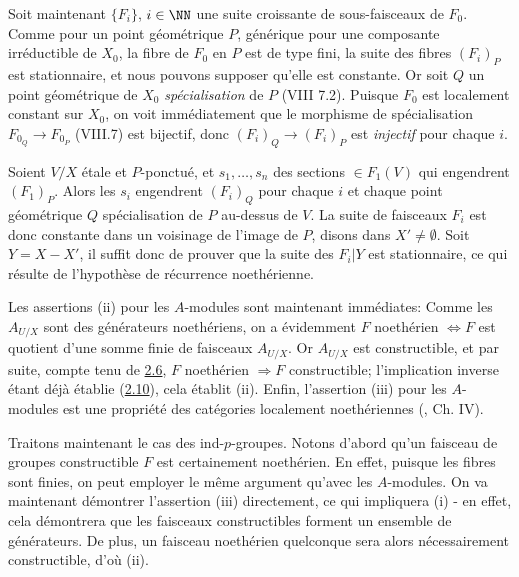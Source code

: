 \documentclass[10pt]{../fichiers-configuration-latex/smfart}
\begin{document}
Soit maintenant $\{F_i\}$, $i\in \NN$ une suite
croissante de sous-faisceaux de $F_0$. Comme pour un point géométrique
$P$, générique pour une composante irréductible de $X_0$, la fibre de
$F_0$ en $P$ est de type fini, la suite des fibres
$(F_i)_P$\pageoriginale est stationnaire, et nous pouvons supposer
qu'elle est constante. Or soit $Q$ un point géométrique de $X_0$
\emph{spécialisation} de $P$ (VIII 7.2). Puisque $F_0$ est localement
constant sur $X_0$, on voit immédiatement que le morphisme de
spécialisation $F_{0_Q}\rightarrow F_{0_P}$ (VIII.7) est bijectif,
donc $(F_i)_Q\rightarrow (F_i)_P$ est \emph{injectif} pour chaque $i$.

Soient $V/X$ étale et $P$-ponctué, et $s_1,\ldots,s_n$ des sections
$\in F_1(V)$ qui engendrent $(F_1)_P$. Alors les $s_i$ engendrent
$(F_i)_Q$ pour chaque $i$ et chaque point géométrique $Q$
spécialisation de $P$ au-dessus de $V$. La suite de faisceaux $F_i$
est donc constante dans un voisinage de l'image de $P$, disons dans
$X'\neq ∅$. Soit $Y=X-X'$, il suffit donc de prouver que la suite
des $F_i| Y$ est stationnaire, ce qui résulte de l'hypothèse de
récurrence noethérienne.

Les assertions (ii) pour les $A$-modules sont maintenant immédiates:
Comme les $A_{U/X}$ sont des générateurs noethériens, on a évidemment
$F$ noethérien $\Leftrightarrow F$ est quotient d'une somme finie de
faisceaux $A_{U/X}$. Or $A_{U/X}$ est constructible, et par suite,
compte tenu de \hyperref[IX.prop2.6]{2.6}, $F$ noethérien $\Rightarrow F$ constructible;
l'implication inverse étant déjà établie (\hyperref[IX.lem2.10]{2.10}), cela établit
(ii). Enfin, l'assertion (iii) pour les $A$-modules est une propriété
des catégories localement noethériennes (\cf [1], Ch. IV).

Traitons maintenant le cas des ind-$p$-groupes. Notons d'abord qu'un
faisceau de groupes constructible $F$ est certainement noethérien. En
effet, puisque les fibres sont finies, on peut employer le même
argument qu'avec les $A$-modules. On va maintenant démontrer
l'assertion (iii) directement, ce qui impliquera (i) - en effet, cela
démontrera que les faisceaux constructibles forment un ensemble de
générateurs. De plus, un faisceau noethérien quelconque sera alors
nécessairement constructible, d'où (ii).
\end{document}
